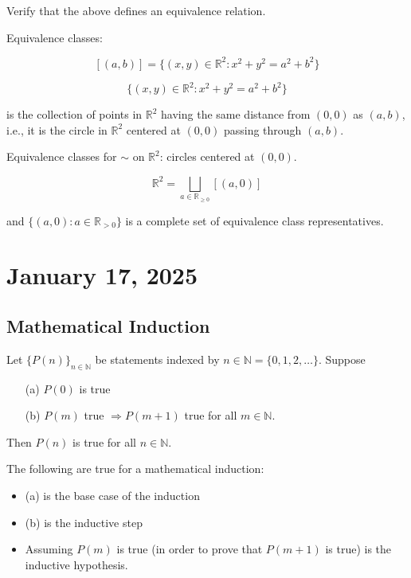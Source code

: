 \documentclass[11pt, draft]{article}
\begin{document}
\begin{problem} Verify that the above defines an equivalence relation.

Equivalence classes:

\[
    [(a, b)] = \{ (x, y) \in \mathbb{R}^2 : x^2 + y^2 = a^2 + b^2 \}
\]

\[
    \{ (x, y) \in \mathbb{R}^2 : x^2 + y^2 = a^2 + b^2 \}
\]

is the collection of points in $\mathbb{R}^2$ having the same distance from
$(0,0)$ as $(a, b)$, i.e., it is the circle in $\mathbb{R}^2$ centered at
$(0,0)$ passing through $(a, b)$.
\end{problem}
\begin{center}
\end{center}

Equivalence classes for $\sim$ on $\mathbb{R}^2$: circles centered at $(0,0)$.

\[
    \mathbb{R}^2 = \bigsqcup_{a \in \mathbb{R}_{\geq 0}} [(a, 0)]
\]

and $\{ (a, 0) : a \in \mathbb{R}_{>0} \}$ is a complete set of equivalence
class representatives.

\section{January 17, 2025}

\subsection{Mathematical Induction}

\begin{definition}
    Let $\{P(n)\}_{n \in \mathbb{N}}$ be statements indexed by $n \in \mathbb{N} = \{0, 1, 2, \ldots\}$. Suppose
    \begin{itemize}
        \item [(a)] $P(0)$ is true
        \item [(b)] $P(m)$ true $\Rightarrow P(m+1)$ true for all $m \in \mathbb{N}$.
    \end{itemize}

    Then $P(n)$ is true for all $n \in \mathbb{N}$.
\end{definition}

\begin{fact}
    The following are true for a mathematical induction:
    \begin{itemize}
        \item (a) is the base case of the induction
        \item (b) is the inductive step
        \item Assuming $P(m)$ is true (in order to prove that $P(m+1)$ is true) is the
              inductive hypothesis.
    \end{itemize}
\end{fact}
\end{document}
